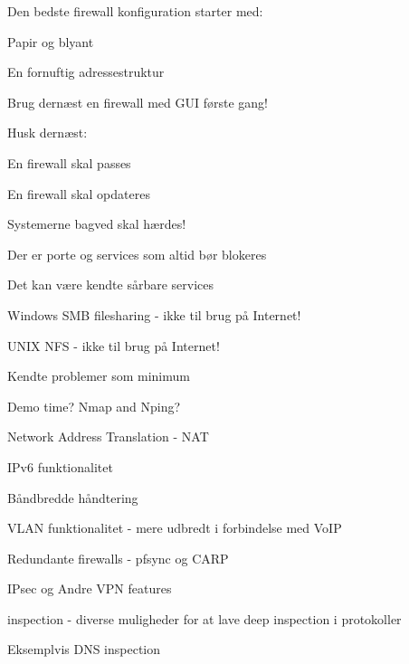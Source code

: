 \documentclass[Screen16to9,17pt]{foils}
\begin{document}

\begin{list1}
\item Den bedste firewall konfiguration starter med:
\begin{list2}
\item Papir og blyant
\item En fornuftig adressestruktur
\end{list2}
\item Brug dernæst en firewall med GUI første gang!
\item Husk dernæst:
\begin{list2}
\item En firewall skal passes
\item En firewall skal opdateres
\item Systemerne bagved skal hærdes!
\end{list2}
\end{list1}





\begin{list1}
\item Der er porte og services som altid bør blokeres
\item Det kan være kendte sårbare services
\begin{list2}
\item Windows SMB filesharing - ikke til brug på Internet!
\item UNIX NFS - ikke til brug på Internet!
\end{list2}
\item Kendte problemer som minimum
\end{list1}

Demo time? Nmap and Nping?



\begin{list2}
\item Network Address Translation - NAT
\item IPv6 funktionalitet

\item Båndbredde håndtering
\item VLAN funktionalitet - mere udbredt i forbindelse med VoIP
\item Redundante firewalls - pfsync og CARP
\item IPsec og Andre VPN features
\item inspection - diverse muligheder for at lave deep inspection i protokoller
\item Eksemplvis DNS inspection
\end{list2}
\end{document}
